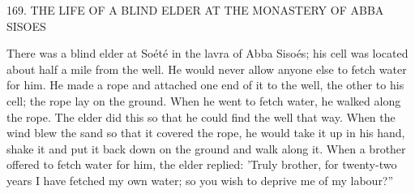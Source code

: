169. THE LIFE OF A BLIND ELDER AT THE
MONASTERY OF ABBA SISOES

There was a blind elder at Soété in the lavra of Abba Sisoés; his cell
was located about half a mile from the well. He would never allow
anyone else to fetch water for him. He made a rope and attached
one end of it to the well, the other to his cell; the rope lay on the
ground. When he went to fetch water, he walked along the rope.
The elder did this so that he could find the well that way. When the
wind blew the sand so that it covered the rope, he would take it up
in his hand, shake it and put it back down on the ground and walk
along it. When a brother offered to fetch water for him, the elder
replied: 'Truly brother, for twenty-two years I have fetched my own
water; so you wish to deprive me of my labour?”

